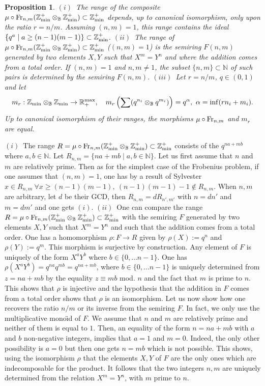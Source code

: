 \documentclass[noams,lp]{compositio}
\newtheorem{prop}[thm]{Proposition}
\def\B{{\mathbb B}}
\def\N{{\mathbb N}}
\def\R{{\mathbb R}}
\def\Z{{\mathbb Z}}
\def\zmin{\Z_{\rm min}}
\def\zminp{\Z_{\rm min}^+}
\def\rmax{\R_+^{\rm max}}
\def\fr{{\rm Fr}}
\begin{document}
\begin{prop}\label{frobcor} 
$(i)$~The range of the composite $\mu\circ \fr_{n,m}(\zmin^+\otimes_\B \zmin^+)\subset \zminp$ depends, up to canonical isomorphism, only upon the ratio $r=n/m$. Assuming $(n,m)=1$, this range contains the ideal
$
\{q^a\mid a\geq (n-1)(m-1)\}\subset \zminp
$.\newline
$(ii)$~The range of $\mu\circ \fr_{n,m}(\zmin^+\otimes_\B \zmin^+)\subset \zmin^+$ ($(n,m)=1$) is the semiring $F(n,m)$ generated by two elements $X,Y$ such that $X^m=Y^n$ and where the addition comes from a total order. If  $(n,m)=1$  and $n,m\neq 1$, the subset  $\{n,m\}\subset \N$ of such pairs is determined by the semiring $F(n,m)$.\newline
$(iii)$~Let $r=n/m$, $q\in(0,1)$  and let 
$$
m_r: \zmin\otimes_\B \zmin\to \rmax,\quad  m_r\left(\sum (q^{n_i}\otimes_\B q^{m_i})\right)=q^\alpha, \   \alpha= \inf (r n_i+ m_i).
$$
Up to canonical isomorphism of their ranges, the  morphisms $\mu\circ \fr_{n,m}$ and $m_r$ are equal.
\end{prop}
\proof 
$(i)$~The range $R=\mu\circ \fr_{n,m}(\zmin^+\otimes_\B \zmin^+)\subset \zminp$ consists of the $q^{na+mb}$ where $a,b\in \N$. Let $R_{n,m}=\{na+mb\mid a,b\in \N\}$. Let us first assume that $n$ and $m$ are relatively prime. Then as for the simplest case of the Frobenius problem, if one assumes that $(n,m)=1$, one has by a result of Sylvester
$
x\in R_{n,m} \  \forall x\geq (n-1)(m-1), \    (n-1)(m-1)-1\notin R_{n,m}.
$
When $n,m$ are arbitrary, let $d$ be their GCD, then $R_{n,m}=dR_{n',m'}$ with $n=dn'$ and $m=dm'$ and one  gets $(i)$.\newline
$(ii)$~One can compare the range $R=\mu\circ \fr_{n,m}(\zmin^+\otimes_\B \zmin^+)\subset \zminp$ with the semiring $F$ generated by two elements $X,Y$ such that $X^m=Y^n$ and such that the addition comes from a total order. One has a homomorphism $\rho:F\to R$ given by $\rho(X):=q^n$ and $\rho(Y):=q^m$. This morphism is surjective by construction. Any element of $F$ is uniquely of the form $X^aY^b$ where $b\in \{0,\ldots n-1\}$. One has 
$
\rho(X^aY^b)=q^{na}q^{mb}=q^{na+mb}
$, 
where $b\in \{0,\ldots n-1\}$ is uniquely determined from $z=na +mb$ by the equality $z\equiv mb$ mod. $n$ and the fact that $m$ is prime to $n$. This shows that $\rho$ is injective and the hypothesis that the addition in $F$ comes from a total order shows that $\rho$ is an isomorphism. Let us now show how one recovers the ratio $n/m$ or its inverse from the semiring $F$. In fact, we only use the multiplicative mono\"{\i}d of $F$. We assume that $n$ and $m$ are relatively prime and neither of them is equal to $1$. Then, an equality of the form $n=na+mb$ with $a$ and $b$ non-negative integers, implies that $a=1$ and $m=0$. Indeed, the only other possibility is $a=0$ but then one gets $n=mb$ which is not possible. This shows, using the isomorphism $\rho$ that the elements $X,Y$ of $F$ are the only ones which are indecomposable for the product. It follows that the two integers $n,m$ are uniquely determined from the relation $X^m=Y^n$, with $m$ prime to $n$. \newline 
\end{document}
